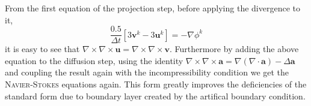 \documentclass[]{scrartcl}
\begin{document}
 From the first equation of the projection step, before applying the divergence to it, 
\begin{equation*}
\dfrac{0.5}{\Delta t} \left[3\mathbf{v}^{k} - 3\mathbf{u}^{k} \right] = -\nabla \phi^{k}
\end{equation*}
it is easy to see that $\nabla \times \nabla \times \mathbf{u} = \nabla \times \nabla \times \mathbf{v}$. Furthermore by adding the above equation to the diffusion step, using the identity $\nabla \times \nabla \times \mathbf{a} = \nabla (\nabla \cdot \mathbf{a}) - \Delta \mathbf{a}$ and coupling the result again with the incompressibility condition we get the \textsc{Navier-Stokes} equations again. This form greatly improves the deficiencies of the standard form due to boundary layer created by the artifical boundary condition. 
\end{document}
